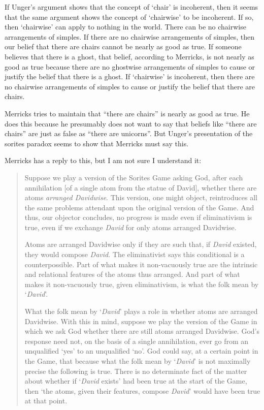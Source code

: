 \documentclass[11pt]{article}
\newenvironment{squote}{%
	\begin{quote}\begin{singlespace}%
	}{%
	\end{singlespace}\end{quote}}
\begin{document}
\begin{spacing}{1.5}
If Unger's argument shows that the concept of `chair' is incoherent,
then it seems that the same argument shows the concept of `chairwise'
to be incoherent.  If so, then `chairwise' can apply to nothing in the
world.  There can be no chairwise arrangements of simples.  If there
are no chairwise arrangements of simples, then our belief that there
are chairs cannot be nearly as good as true.  If someone believes that
there is a ghost, that belief, according to Merricks, is not nearly as
good as true because there are no ghostwise arrangements of simples to
cause or justify the belief that there is a ghost.  If `chairwise' is
incoherent, then there are no chairwise arrangements of simples to
cause or justify the belief that there are chairs.

Merricks tries to maintain that ``there are chairs'' is nearly as good
as true.  He does this because he presumably does not want to say that
beliefs like ``there are chairs'' are just as false as ``there are
unicorns''.  But Unger's presentation of the sorites paradox seems to
show that Merricks must say this.

Merricks has a reply to this, but I am not sure I understand it:

\begin{squote}
Suppose we play a version of the Sorites Game asking God, after each
annihilation [of a single atom from the statue of David], whether
there are atoms {\em arranged Davidwise}.  This version, one might
object, reintroduces all the same problems attendant upon the original
version of the Game.  And thus, our objector concludes, no progress is
made even if eliminativism is true, even if we exchange {\em David}
for only atoms arranged Davidwise.  

Atoms are arranged Davidwise only if they are such that, if {\em
  David} existed, they would compose {\em David}.  The eliminativist
says this conditional is a counterpossible. Part of what makes it
non-vacuously true are the intrinsic and relational features of the
atoms thus arranged.  And part of what makes it non-vacuously true,
given eliminativism, is what the folk mean by `{\em David}'.

What the folk mean by `{\em David}' plays a role in whether atoms are
arranged Davidwise.  With this in mind, suppose we play the version of
the Game in which we ask God whether there are still atoms arranged
Davidwise.  God's response need not, on the basis of a single
annihilation, ever go from an unqualified `yes' to an unqualified
`no'. God could say, at a certain point in the Game, that because what
the folk mean by `{\em David}' is not maximally precise the following
is true.  There is no determinate fact of the matter about whether if
`{\em David} exists' had been true at the start of the Game, then `the
atoms, given their features, compose {\em David}' would have been true
at that point.


\end{squote}
\end{spacing}
\end{document}
